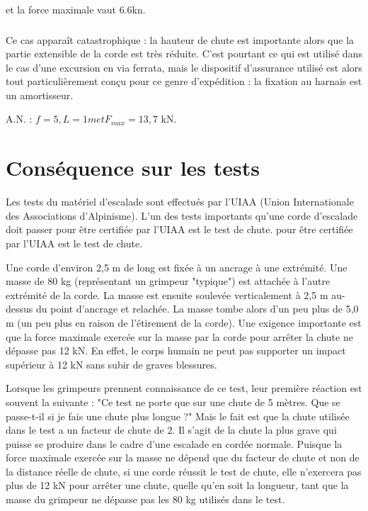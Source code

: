 \documentclass[a4paper,10pt,french]{scrartcl}
\begin{document}
et la force maximale vaut $6.6$kn.
\subsubsection{}
Ce cas apparaît catastrophique : la hauteur de chute est importante alors que la partie extensible de la corde est très réduite.
C’est pourtant ce qui est utilisé dans le cas d’une excursion en via ferrata, mais le dispositif d’assurance utilisé est alors tout particulièrement conçu pour ce genre d’expédition :
la fixation au harnais est un amortisseur.

A.N. : $f = 5, L = 1m et F_{max} = 13,7$ kN.

\section{Cons\'equence sur les tests}
Les tests du mat\'eriel d'escalade sont effectu\'es par l'UIAA (Union Internationale des Associations d'Alpinisme). L'un des tests importants qu'une corde d'escalade doit passer pour \^etre certifi\'ee par l'UIAA est le test de chute. pour \^etre certifi\'ee par l'UIAA est le test de chute.

Une corde d'environ 2,5 m de long est fix\'ee \`a un ancrage \`a une extr\'emit\'e. Une masse de 80 kg (repr\'esentant un grimpeur "typique") est attach\'ee \`a l'autre extr\'emit\'e de la corde. La masse est ensuite soulev\'ee verticalement \`a 2,5 m au-dessus du point d'ancrage et relach\'ee. La masse tombe alors d'un peu plus de 5,0 m (un peu plus en raison de l'\'etirement de la corde).
Une exigence importante est que la force maximale exerc\'ee sur la masse par la corde pour arr\^eter la chute ne d\'epasse pas 12 kN. En effet, le corps humain ne peut pas supporter un impact sup\'erieur \`a 12 kN sans subir de graves blessures.

Lorsque les grimpeurs prennent connaissance de ce test, leur premi\`ere r\'eaction est souvent la suivante : "Ce test ne porte que sur une chute de 5 m\`etres. Que se passe-t-il si je fais une chute plus longue ?" Mais le fait est que la chute utilis\'ee dans le test a un facteur de chute de 2. Il s'agit de la chute la plus grave qui puisse se produire dans le cadre d'une escalade en cord\'ee normale. Puisque la force maximale exerc\'ee sur la masse ne d\'epend que du facteur de chute et non de la distance r\'eelle de chute, si une corde r\'eussit le test de chute, elle n'exercera pas plus de 12 kN pour arr\^eter une chute, quelle qu'en soit la longueur, tant que la masse du grimpeur ne d\'epasse pas les 80 kg utilis\'es dans le test.
\end{document}
